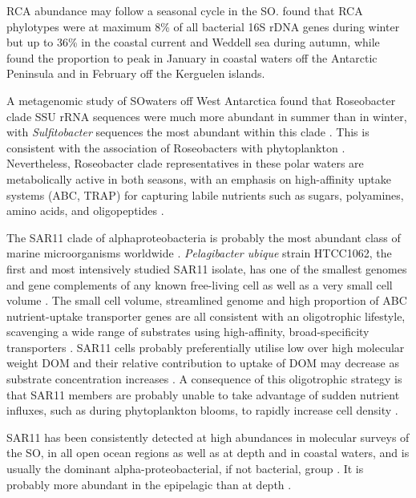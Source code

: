 \ac{RCA} abundance may follow a seasonal cycle in the \ac{SO}.
\citep{Giebel:2009hr} found that \ac{RCA} phylotypes were at maximum 8\% of all bacterial 16S rDNA genes during winter but up to 36\% in the coastal current and Weddell sea during autumn, while \citep{Ghiglione:2011ee} found the proportion to peak in January in coastal waters off the Antarctic Peninsula and in February off the Kerguelen islands. 

A metagenomic study of \ac{SO}waters off West Antarctica found that Roseobacter clade \ac{SSU} rRNA sequences were much more abundant in summer than in winter, with \emph{Sulfitobacter} sequences the most abundant within this clade \cite{Grzymski:2012ej}.
This is consistent with the association of Roseobacters with phytoplankton \cite{Moran:2003cwa}.
Nevertheless, Roseobacter clade representatives in these polar waters are metabolically active in both seasons, with an emphasis on high-affinity uptake systems (ABC, TRAP) for capturing labile nutrients such as sugars, polyamines, amino acids, and oligopeptides \cite{Williams:2012bs}.


The SAR11 clade of alphaproteobacteria is probably the most abundant class of marine microorganisms worldwide \cite{Morris:2002bn}.
\emph{Pelagibacter ubique} strain HTCC1062, the first and most intensively studied SAR11 isolate, has one of the smallest genomes and gene complements of any known free-living cell as well as a very small cell volume \cite{Giovannoni:2005ib}.
The small cell volume, streamlined genome and high proportion of ABC nutrient-uptake transporter genes are all consistent with an oligotrophic lifestyle, scavenging a wide range of substrates using high-affinity, broad-specificity transporters \cite{Giovannoni:2005ib,Lauro:2009gx,Sowell:2008ks}.
SAR11 cells probably preferentially utilise low over high molecular weight \ac{DOM} \cite{Malmstrom:2005el} and their relative contribution to uptake of \ac{DOM} may decrease as substrate concentration increases \cite{Alonso:2006dj}.
A consequence of this oligotrophic strategy is that SAR11 members are probably unable to take advantage of sudden nutrient influxes, such as during phytoplankton blooms, to rapidly increase cell density \cite{Tripp:2008dd}.

SAR11 has been consistently detected at high abundances in molecular surveys of the \ac{SO}, in all open ocean regions as well as at depth and in coastal waters, and is usually the dominant alpha-proteobacterial, if not bacterial, group \cite{Giebel:2009hr,Murray:2007db,LopezGarcia:2001vp,Straza:2010io,Jamieson:2012up,GarciaMartinez:2000fu,Ghiglione:2011ee,Murray:2011ib,Piquet:2011fj}.
It is probably more abundant in the epipelagic than at depth \cite{Giebel:2009hr}.

